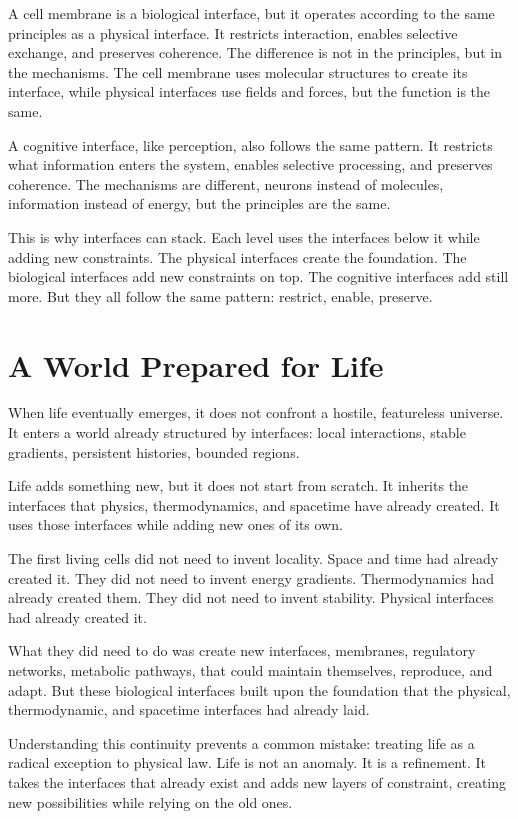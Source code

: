 \documentclass[
  openright]{book}
\begin{document}
A cell membrane is a biological interface, but it operates according to
the same principles as a physical interface. It restricts interaction,
enables selective exchange, and preserves coherence. The difference is
not in the principles, but in the mechanisms. The cell membrane uses
molecular structures to create its interface, while physical interfaces
use fields and forces, but the function is the same.

A cognitive interface, like perception, also follows the same pattern.
It restricts what information enters the system, enables selective
processing, and preserves coherence. The mechanisms are different,
neurons instead of molecules, information instead of energy, but the
principles are the same.

This is why interfaces can stack. Each level uses the interfaces below
it while adding new constraints. The physical interfaces create the
foundation. The biological interfaces add new constraints on top. The
cognitive interfaces add still more. But they all follow the same
pattern: restrict, enable, preserve.

\section{A World Prepared for Life}\label{a-world-prepared-for-life}

When life eventually emerges, it does not confront a hostile,
featureless universe. It enters a world already structured by
interfaces: local interactions, stable gradients, persistent histories,
bounded regions.

Life adds something new, but it does not start from scratch. It inherits
the interfaces that physics, thermodynamics, and spacetime have already
created. It uses those interfaces while adding new ones of its own.

The first living cells did not need to invent locality. Space and time
had already created it. They did not need to invent energy gradients.
Thermodynamics had already created them. They did not need to invent
stability. Physical interfaces had already created it.

What they did need to do was create new interfaces, membranes,
regulatory networks, metabolic pathways, that could maintain themselves,
reproduce, and adapt. But these biological interfaces built upon the
foundation that the physical, thermodynamic, and spacetime interfaces
had already laid.

Understanding this continuity prevents a common mistake: treating life
as a radical exception to physical law. Life is not an anomaly. It is a
refinement. It takes the interfaces that already exist and adds new
layers of constraint, creating new possibilities while relying on the
old ones.
\end{document}
